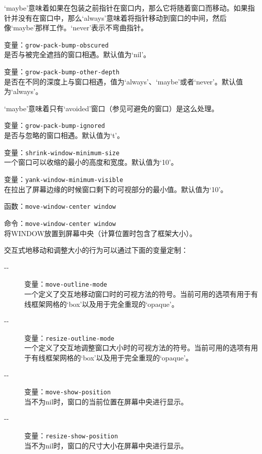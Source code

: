 \documentclass{book}
\begin{document}
\begin{CJK*}{UTF8}{gbsn}
\begin{description}
`maybe'意味着如果在包装之前指针在窗口内，那么它将随着窗口而移动。如果指针并没有在窗口中，那么`always'意味着将指针移动到窗口的中间，然后像`maybe'那样工作。`never'表示不弯曲指针。
\item[-{}-] 变量：\verb|grow-pack-bump-obscured|\\
是否与被完全遮挡的窗口相遇。默认值为`nil'。
\item[-{}-] 变量：\verb|grow-pack-bump-other-depth|\\
是否在不同的深度上与窗口相遇，值为`always'、`maybe'或者`never'。默认值为`always'。

`maybe'意味着只有`avoided'窗口（参见可避免的窗口）是这么处理。
\item[-{}-] 变量：\verb|grow-pack-bump-ignored|\\
是否与忽略的窗口相遇。默认值为`t'。
\item[-{}-] 变量：\verb|shrink-window-minimum-size|\\
一个窗口可以收缩的最小的高度和宽度。默认值为`10'。
\item[-{}-] 变量：\verb|yank-window-minimum-visible|\\
在拉出了屏幕边缘的时候窗口剩下的可视部分的最小值。默认值为`10'。
\item[-{}-] 函数：\verb|move-window-center window|
\item[-{}-] 命令：\verb|move-window-center window|\\
将WINDOW放置到屏幕中央（计算位置时包含了框架大小）。
\end{description}

交互式地移动和调整大小的行为可以通过下面的变量定制：
\begin{description}
\item[-{}-] 变量：\verb|move-outline-mode|\\
一个定义了交互地移动窗口时的可视方法的符号。当前可用的选项有用于有线框架网格的`box'以及用于完全重现的`opaque'。
\item[-{}-] 变量：\verb|resize-outline-mode|\\
一个定义了交互地调整窗口大小时的可视方法的符号。当前可用的选项有用于有线框架网格的`box'以及用于完全重现的`opaque'。
\item[-{}-] 变量：\verb|move-show-position|\\
当不为nil时，窗口的当前位置在屏幕中央进行显示。
\item[-{}-] 变量：\verb|resize-show-position|\\
当不为nil时，窗口的尺寸大小在屏幕中央进行显示。
\end{description}


\end{CJK*}
\end{document}
